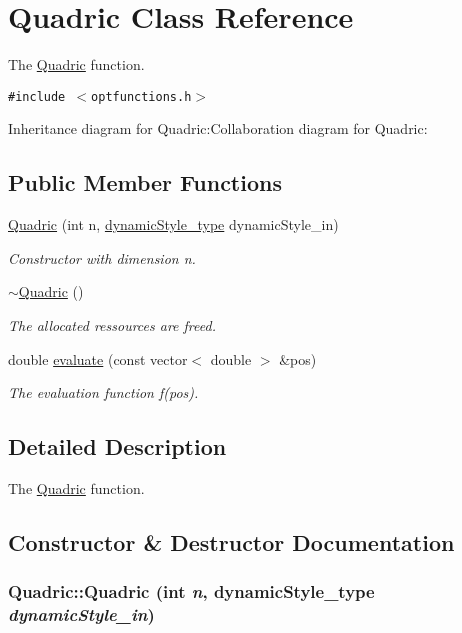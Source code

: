 \hypertarget{classQuadric}{
\section{Quadric Class Reference}
\label{classQuadric}
}
The \hyperlink{classQuadric}{Quadric} function.  


{\tt \#include $<$optfunctions.h$>$}

Inheritance diagram for Quadric:Collaboration diagram for Quadric:\subsection*{Public Member Functions}
\begin{CompactItemize}
\item 
\hyperlink{classQuadric_420bdad7d6f79c3a242f26ad5fd8ff31}{Quadric} (int n, \hyperlink{optfunctions_8h_ae9aa3a5dd199a43e77abc2cccf4477e}{dynamicStyle\_\-type} dynamicStyle\_\-in)
\begin{CompactList}\small\item\em Constructor with dimension n. \item\end{CompactList}\item 
\hyperlink{classQuadric_4550e4e9eee3832eda3cbac34829e2dd}{$\sim$Quadric} ()
\begin{CompactList}\small\item\em The allocated ressources are freed. \item\end{CompactList}\item 
double \hyperlink{classQuadric_897b3e96e1f1223bf0b2b9fdce32698d}{evaluate} (const vector$<$ double $>$ \&pos)
\begin{CompactList}\small\item\em The evaluation function f(pos). \item\end{CompactList}\end{CompactItemize}


\subsection{Detailed Description}
The \hyperlink{classQuadric}{Quadric} function. 

\subsection{Constructor \& Destructor Documentation}
\hypertarget{classQuadric_420bdad7d6f79c3a242f26ad5fd8ff31}{
\subsubsection{\setlength{\rightskip}{0pt plus 5cm}Quadric::Quadric (int {\em n}, \/  {\bf dynamicStyle\_\-type} {\em dynamicStyle\_\-in})}}
\label{classQuadric_420bdad7d6f79c3a242f26ad5fd8ff31}


